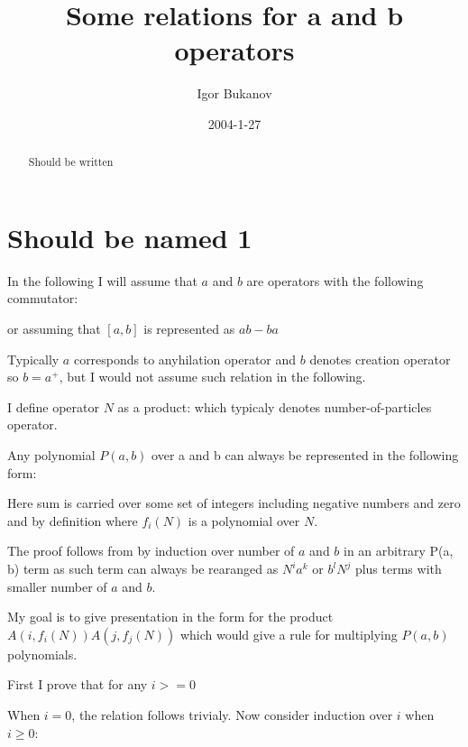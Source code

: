 \documentclass{article}
\title {Some relations for a and b operators}
\author {Igor Bukanov}
\date { 2004-1-27 }
\begin{document}
\begin{abstract}
Should be written
\end{abstract}

\section{Should be named 1}

In the following I will assume that $a$ and $b$ are operators with the following commutator:


or assuming that $[a, b]$ is represented as $ab - ba$


Typically $a$ corresponds to anyhilation operator and $b$ denotes creation operator so $b = a^+$, but I would not assume such relation in the following.
\p

I define operator $N$ as a product:
which typicaly denotes number-of-particles operator.

\p

Any polynomial $P(a, b)$ over a and b can always be represented in the following form:

Here sum is carried over some set of integers including negative numbers and zero and by definition
where $f_i(N)$ is a polynomial over $N$.

\p

The proof follows from  by induction over number of $a$ and $b$ in an arbitrary P(a, b) term as such term can always be rearanged as $N^ia^k$ or $b^lN^j$ plus terms with smaller number of $a$ and $b$.

\p

My goal is to give presentation in the form  for the product $A(i, f_i(N)) A(j, f_j(N))$ which would give a rule for multiplying $P(a,b)$ polynomials.

\p First I prove that for any $i >= 0$

When $i = 0$, the relation follows trivialy. Now consider induction over $i$ when $i \ge 0$:
\end{document}
